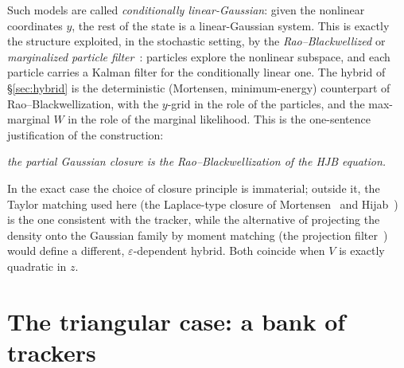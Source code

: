 \documentclass[11pt,a4paper]{article}
\newcommand{\eps}{\varepsilon}
\theoremstyle{plain}
\theoremstyle{definition}
\theoremstyle{remark}
\begin{document}
Such models are called \emph{conditionally linear-Gaussian}: given the nonlinear coordinates $y$, the rest of the state is a linear-Gaussian system. This is exactly the structure exploited, in the stochastic setting, by the \emph{Rao--Blackwellized} or \emph{marginalized particle filter}~\cite{Doucet2000,Schon2005}: particles explore the nonlinear subspace, and each particle carries a Kalman filter for the conditionally linear one. The hybrid of \S\ref{sec:hybrid} is the deterministic (Mortensen, minimum-energy) counterpart of Rao--Blackwellization, with the $y$-grid in the role of the particles, and the max-marginal $W$ in the role of the marginal likelihood. This is the one-sentence justification of the construction:
\begin{center}
  \emph{the partial Gaussian closure is the Rao--Blackwellization of the HJB equation.}
\end{center}
In the exact case the choice of closure principle is immaterial; outside it, the Taylor matching used here (the Laplace-type closure of Mortensen~\cite{Mortensen1968} and Hijab~\cite{Hijab1980}) is the one consistent with the tracker, while the alternative of projecting the density onto the Gaussian family by moment matching (the projection filter~\cite{Brigo1998}) would define a different, $\eps$-dependent hybrid. Both coincide when $V$ is exactly quadratic in $z$.

\section{The triangular case: a bank of trackers}
\label{sec:triangular}
\end{document}
